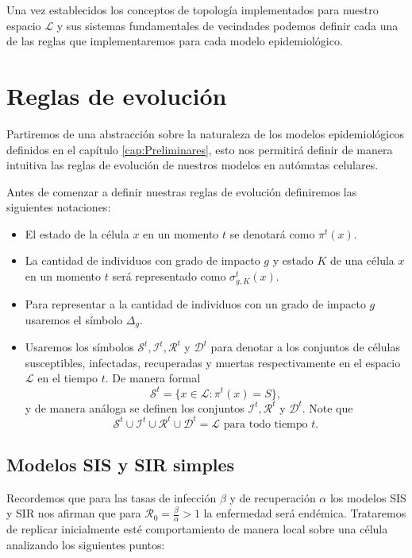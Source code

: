 Una vez establecidos los conceptos de topología implementados para nuestro espacio $\mathcal{L}$ y sus sistemas fundamentales de vecindades podemos definir cada una de las reglas que implementaremos para cada modelo epidemiológico.

\section{Reglas de evolución}\label{sec:ReglasDeEvolución}

Partiremos de una abstracción sobre la naturaleza de los modelos epidemiológicos definidos en el capítulo \ref{cap:Preliminares}, esto nos permitirá definir de manera intuitiva las reglas de evolución de nuestros modelos en autómatas celulares.

Antes de comenzar a definir nuestras reglas de evolución definiremos las siguientes notaciones:
\begin{itemize}
    \item El estado de la célula $x$ en un momento $t$ se denotará como $\pi^t(x)$.
    \item La cantidad de individuos con grado de impacto $g$ y estado $K$ de una célula $x$ en un momento $t$ será representado como $\sigma_{g,K}^t(x)$.
    \item Para representar a la cantidad de individuos con un grado de impacto $g$ usaremos el símbolo $\Delta_g$. 
    \item Usaremos los símbolos $\mathcal{S}^t,\mathcal{I}^t,\mathcal{R}^t$ y $\mathcal{D}^t$ para denotar a los conjuntos de células susceptibles, infectadas, recuperadas y muertas respectivamente en el espacio $\mathcal{L}$ en el tiempo $t$. De manera formal
    $$\mathcal{S}^t=\{x\in\mathcal{L}:\pi^t(x)=S\},$$
    y de manera análoga se definen los conjuntos $\mathcal{I}^t,\mathcal{R}^t$ y $\mathcal{D}^t$. Note que $$\mathcal{S}^t\cup\mathcal{I}^t\cup\mathcal{R}^t\cup\mathcal{D}^t=\mathcal{L}\text{ para todo tiempo }t.$$
\end{itemize}

\subsection{Modelos SIS y SIR simples}\label{sub:SISySIRSimples}

Recordemos que para las tasas de infección $\beta$ y de recuperación $\alpha$ los modelos SIS y SIR nos afirman que para $\mathcal{R}_0=\frac{\beta}{\alpha}>1$ la enfermedad será endémica. Trataremos de replicar inicialmente esté comportamiento de manera local sobre una célula analizando los siguientes puntos:

